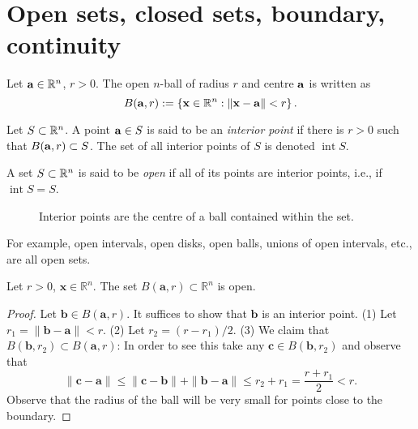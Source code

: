 \section{Open sets, closed sets, boundary, continuity}

Let \(\aa \in \bR^n\), \(r>0\).
The open \(n\)-ball of radius \(r\) and centre \(\aa\) is written as
\[
    B(\aa,r):= \left\{ \xx \in \bR^n : \norm{\xx - \aa}< r  \right\}.
\]

\begin{definition}
    Let \(S \subset \bR^n\).
    A point \(\aa \in S\) is said to be an \emph{interior point} if there is \(r>0\) such that \( B(\aa,r) \subset S\).
    The set of all interior points of \(S\) is denoted \(\operatorname{int} S\).
\end{definition}

\begin{definition}
    A set \(S \subset \bR^n\) is said to be \emph{open} if all of its points are interior points, i.e., if \(\operatorname{int} S = S\).
\end{definition}



\begin{figure}[htbp]
    \begin{center}
        \caption{Interior points are the centre of a ball contained within the set.}
    \end{center}
\end{figure}


For example,
open intervals, open disks, open balls, unions of open intervals, etc., are all open sets.

\begin{lemma*}
    Let $r>0$, $\mathbf{x} \in \mathbb{R}^n$. The set $B(\mathbf{a},r) \subset \mathbb{R}^n$ is open.
\end{lemma*}
\begin{proof}
    Let $\mathbf{b} \in B(\mathbf{a},r)$. It suffices to show that $\mathbf{b}$ is an interior point.
    (1) Let $r_1 = \| \mathbf{b} - \mathbf{a} \| < r$.
    (2) Let $r_2 = (r - r_1)/2$.
    (3) We claim that $B(\mathbf{b},r_2) \subset B(\mathbf{a},r)$:
    In order to see this take any $\mathbf{c} \in B(\mathbf{b},r_2)$ and observe that
    $$\| \mathbf{c} - \mathbf{a} \| \leq \| \mathbf{c} - \mathbf{b} \|  + \| \mathbf{b} - \mathbf{a} \| \leq r_2 + r_1 = \frac{r + r_1}{2} < r.$$
    Observe that the radius of the ball will be very small for points close to the boundary.
\end{proof}



